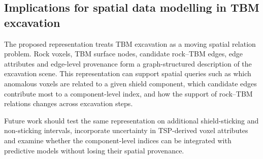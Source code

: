 \subsection{Implications for spatial data modelling in TBM excavation}
\label{sec:discussion-spatial-data-model}

The proposed representation treats TBM excavation as a moving spatial relation problem. Rock voxels, TBM surface nodes, candidate rock--TBM edges, edge attributes and edge-level provenance form a graph-structured description of the excavation scene. This representation can support spatial queries such as which anomalous voxels are related to a given shield component, which candidate edges contribute most to a component-level index, and how the support of rock--TBM relations changes across excavation steps.

Future work should test the same representation on additional shield-sticking and non-sticking intervals, incorporate uncertainty in TSP-derived voxel attributes and examine whether the component-level indices can be integrated with predictive models without losing their spatial provenance.